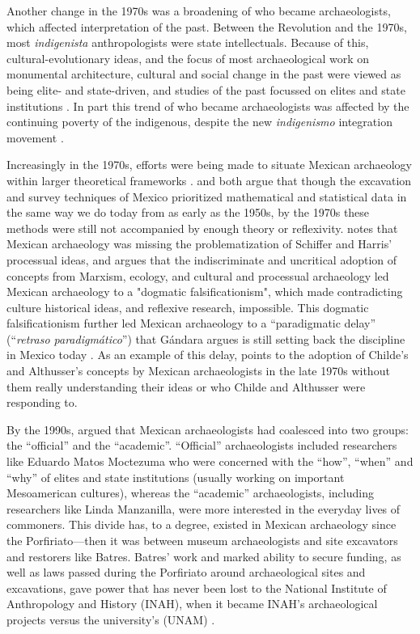 Another change in the 1970s was a broadening of who became archaeologists, which affected interpretation of the past. Between the Revolution and the 1970s, most \textit{indigenista} anthropologists were state intellectuals. Because of this, cultural-evolutionary ideas, and the focus of most archaeological work on monumental architecture, cultural and social change in the past were viewed as being elite- and state-driven, and studies of the past focussed on elites and state institutions \parencites[220-230]{Gomez2007}[84]{Patterson1995}. 
In part this trend of who became archaeologists was affected by the continuing poverty of the indigenous, despite the new \textit{indigenismo} integration movement \parencite[84]{Patterson1995}. 

Increasingly in the 1970s, efforts were being made to situate Mexican archaeology within larger theoretical frameworks \parencite[19-25]{Matos1979}. 
\textcite{Matos1979} and \textcite{Gomez2007} both argue that though the excavation and survey techniques of Mexico prioritized mathematical and statistical data in the same way we do today from as early as the 1950s, by the 1970s these methods were still not accompanied by enough theory or reflexivity. 
\textcite[229]{Gomez2007} notes that Mexican archaeology was missing the problematization of Schiffer and Harris’ processual ideas, and 
\textcite{Gandara1981} argues that the indiscriminate and uncritical adoption of concepts from Marxism, ecology, and cultural and processual archaeology led Mexican archaeology to a "dogmatic falsificationism", which made contradicting culture historical ideas, and reflexive research, impossible. This dogmatic falsificationism further led Mexican archaeology to a “paradigmatic delay” (“\textit{retraso paradigmático}”) that Gándara argues is still setting back the discipline in Mexico today 
\parencites{Gandara1981}{Gandara1987}{Gomez2007}. As an example of this delay, \textcite[21]{Matos1979} points to the adoption of Childe’s and Althusser’s concepts by Mexican archaeologists in the late 1970s without them really understanding their ideas or who Childe and Althusser were responding to.

By the 1990s, \textcite{Leon1996} argued that Mexican archaeologists had coalesced into two groups: the “official” and the “academic”. “Official” archaeologists included researchers like Eduardo Matos Moctezuma who were concerned with the “how”, “when” and “why” of elites and state institutions (usually working on important Mesoamerican cultures), whereas the “academic” archaeologists, including researchers like Linda Manzanilla, were more interested in the everyday lives of commoners. 
This divide has, to a degree, existed in Mexican archaeology since the Porfiriato—then it was between museum archaeologists and site excavators and restorers like Batres. Batres’ work and marked ability to secure funding, as well as laws passed during the Porfiriato around archaeological sites and excavations, gave power that has never been lost to the National Institute of Anthropology and History (INAH), when it became INAH’s archaeological projects versus the university’s (UNAM) \parencite[79]{Bueno2016}.

